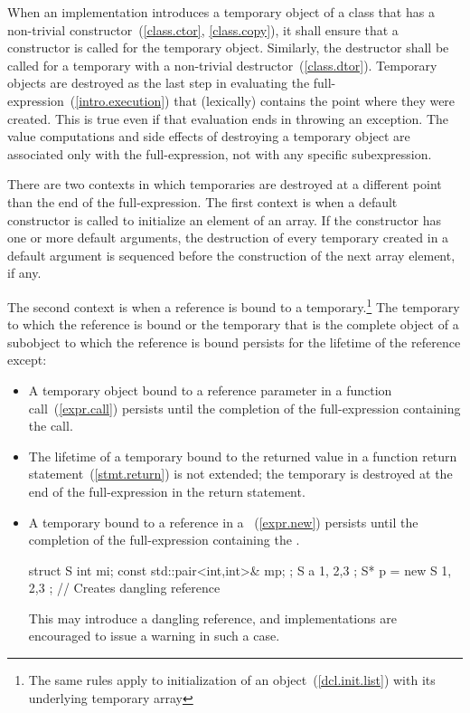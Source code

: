 \pnum
{}%
%
%
When an implementation introduces a temporary object of a class that has a
non-trivial constructor~(\ref{class.ctor}, \ref{class.copy}), it shall ensure that
a constructor is called for the temporary object.
Similarly, the destructor shall be called for a temporary with a non-trivial
destructor~(\ref{class.dtor}).
Temporary objects are destroyed as the last step
in evaluating
the full-expression~(\ref{intro.execution})
that (lexically) contains the point where
they were created.
This is true even if that evaluation ends in throwing an exception.
The
%
value computations and
%
side effects of destroying a temporary object
are associated only with the full-expression, not with any specific
subexpression.

\pnum
{}%
%
There are two contexts in which temporaries are destroyed at a different
point than the end of the full-expression.
The first context is when a default constructor is called to initialize an
element of an array. If the constructor has one or more default arguments,
the destruction of every temporary created in
a default argument is sequenced before the construction of the next array element, if any.

\pnum
The second context is when a reference is bound to a
temporary.\footnote{The same rules apply to initialization of an
   object~(\ref{dcl.init.list}) with its
  underlying temporary array}
The temporary to which the reference is bound or the temporary
that is the complete object of a subobject to which the reference is bound
persists for the lifetime of the reference except:

\begin{itemize}
\item A temporary object bound to a reference parameter in a function call~(\ref{expr.call})
persists until the completion of the full-expression containing the call.

\item The lifetime of a temporary bound to the returned value in a function return statement~(\ref{stmt.return}) is not extended; the temporary is destroyed at the end of the full-expression in the return statement.

\item A temporary bound to a reference in a ~(\ref{expr.new}) persists until the completion of the full-expression containing the . \enterexample
\begin{codeblock}
struct S { int mi; const std::pair<int,int>& mp; };
S a { 1, {2,3} };
S* p = new S{ 1, {2,3} };   // Creates dangling reference
\end{codeblock}
\exitexample \enternote This may introduce a dangling reference, and implementations are encouraged to issue a warning in such a case. \exitnote
\end{itemize}

